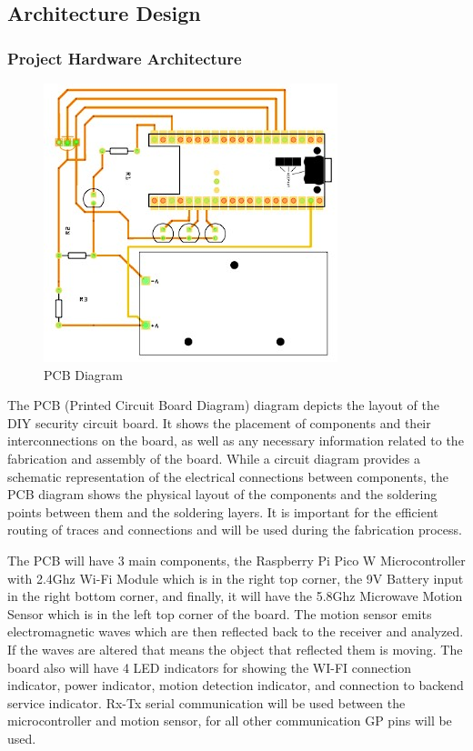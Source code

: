 \documentclass[conference]{IEEEtran}
\begin{document}
\subsection{Architecture Design}

\subsubsection{Project Hardware Architecture}

\begin{figure}[htbp]
      \centering
      \includegraphics[width=0.8\linewidth]{pcbDiagram.jpg}
      \caption{PCB Diagram}
      \label{fig:pcbDiagram}
\end{figure}

The PCB (Printed Circuit Board Diagram) diagram depicts the layout of the DIY security
circuit board. It shows the placement of components and their interconnections on the
board, as well as any necessary information related to the fabrication and assembly of
the board. While a circuit diagram provides a schematic representation of the electrical
connections between components, the PCB diagram shows the physical layout of the
components and the soldering points between them and the soldering layers. It is
important for the efficient routing of traces and connections and will be used during
the fabrication process.

The PCB will have 3 main components, the Raspberry Pi Pico W Microcontroller with
2.4Ghz Wi-Fi Module which is in the right top corner, the 9V Battery input in the
right bottom corner, and finally, it will have the 5.8Ghz Microwave Motion Sensor
which is in the left top corner of the board. The motion sensor emits electromagnetic
waves which are then reflected back to the receiver and analyzed. If the waves are
altered that means the object that reflected them is moving. The board also will have
4 LED indicators for showing the WI-FI connection indicator, power indicator,
motion detection indicator, and connection to backend service indicator.
Rx-Tx serial communication will be used between the microcontroller and motion sensor,
for all other communication GP pins will be used.
\end{document}

